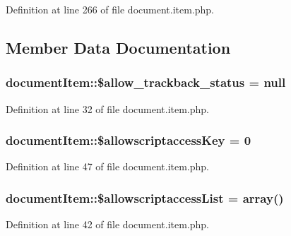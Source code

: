 Definition at line 266 of file document.\-item.\-php.



\subsection{Member Data Documentation}
\hypertarget{classdocumentItem_aaf08d80bedc01fc0fc0370677a4ba9cc}{
\subsubsection[{\$allow\-\_\-trackback\-\_\-status}]{\setlength{\rightskip}{0pt plus 5cm}document\-Item\-::\$allow\-\_\-trackback\-\_\-status = null}}\label{classdocumentItem_aaf08d80bedc01fc0fc0370677a4ba9cc}


Definition at line 32 of file document.\-item.\-php.

\hypertarget{classdocumentItem_ab4273ebe05df985235bf651d918bd4f8}{
\subsubsection[{\$allowscriptaccess\-Key}]{\setlength{\rightskip}{0pt plus 5cm}document\-Item\-::\$allowscriptaccess\-Key = 0}}\label{classdocumentItem_ab4273ebe05df985235bf651d918bd4f8}


Definition at line 47 of file document.\-item.\-php.

\hypertarget{classdocumentItem_a3b10cc840f3a20580d3ab2269ef24df3}{
\subsubsection[{\$allowscriptaccess\-List}]{\setlength{\rightskip}{0pt plus 5cm}document\-Item\-::\$allowscriptaccess\-List = array()}}\label{classdocumentItem_a3b10cc840f3a20580d3ab2269ef24df3}


Definition at line 42 of file document.\-item.\-php.

